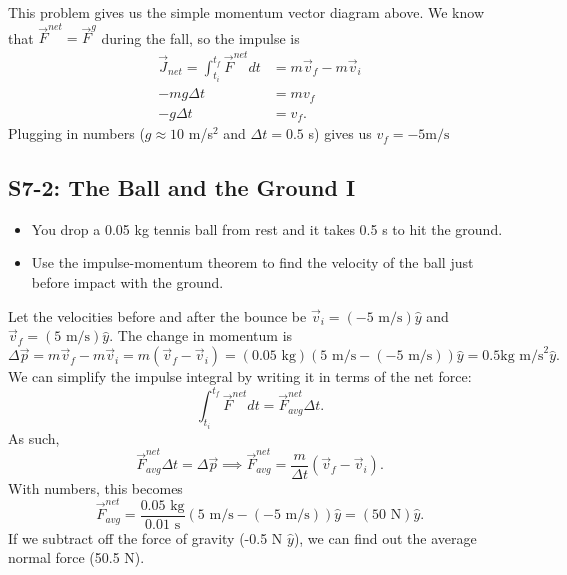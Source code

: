 \documentclass[]{article}
\begin{document}
\newpage
\begin{TeacherMargin}
\begin{center}
\end{center}
This problem gives us the simple momentum vector diagram above. We know that $\vec{F}^{net} =\vec{F}^{g}$ during the fall, so the impulse is
\begin{align*}
	\vec{J}_{net} = \int_{t_{i}}^{t_{f}}\vec{F}^{net}dt & = m\vec{v}_{f} - m\vec{v}_{i} \\
	-mg\Delta t & = mv_{f} \\
	-g\Delta t & = v_{f}.
\end{align*}
Plugging in numbers ($g\approx 10$ m/s$^{2}$ and $\Delta t = 0.5$ s) gives us $v_{f} = -5\text{m}/\text{s}$
\end{TeacherMargin}
\begin{PresentSpace}
\vspace{-10pt}
\section*{S7-2: The Ball and the Ground I}
\vspace{-10pt}
\begin{itemize}
	\item You drop a 0.05 kg tennis ball from rest and it takes 0.5 s to hit the ground.
	\item Use the impulse-momentum theorem to find the velocity of the ball just before impact with the ground.
\end{itemize}
\end{PresentSpace}
\newpage
\begin{TeacherMargin}
\begin{center}
\end{center}
Let the velocities before and after the bounce be $\vec{v}_{i} = (-5\text{ m}/\text{s})\hat{y}$ and $\vec{v}_{f} = (5\text{ m}/\text{s})\hat{y}$. The change in momentum is
\[
\Delta\vec{p} = m\vec{v}_{f} - m\vec{v}_{i} = m \left(\vec{v}_{f} - \vec{v}_{i}\right) = (0.05\text{ kg})(5\text{ m}/\text{s} - (-5\text{ m}/\text{s}))\hat{y} = 0.5 \text{kg m/s}^{2}\hat{y}.
\]
We can simplify the impulse integral by writing it in terms of the net force:
\[
\int_{t_{i}}^{t_{f}}\vec{F}^{net}dt = \vec{F}^{net}_{avg}\Delta t.
\]
As such,
\[
\vec{F}^{net}_{avg}\Delta t = \Delta\vec{p} \implies \vec{F}^{net}_{avg} = \frac{m}{\Delta t}\left(\vec{v}_{f}-\vec{v}_{i}\right).
\]
With numbers, this becomes
\[
\vec{F}^{net}_{avg} = \frac{0.05\text{ kg}}{0.01\text{ s}}\left(5\text{ m}/\text{s}-(-5\text{ m}/\text{s})\right)\hat{y} = (50\text{ N})\hat{y}.
\]
If we subtract off the force of gravity (-0.5 N $\hat{y}$), we can find out the average normal force (50.5 N).
\end{TeacherMargin}
\end{document}

